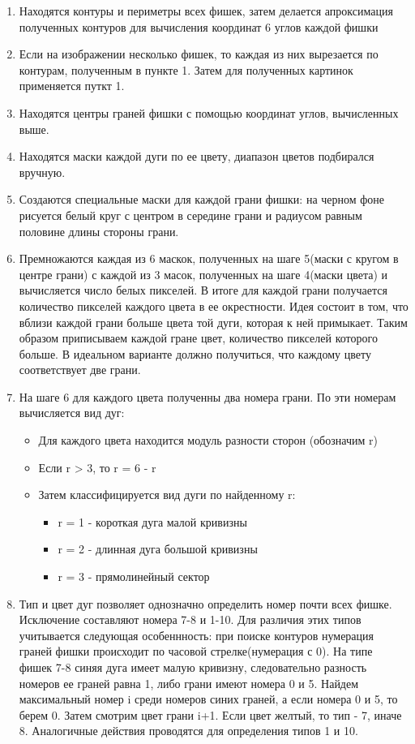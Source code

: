 \documentclass[a4paper, 12pt]{article}
\begin{document}
\begin{enumerate}
        \item Находятся контуры и периметры всех фишек, затем делается апроксимация полученных контуров для вычисления координат 6 углов каждой фишки
        \item Если на изображении несколько фишек, то каждая из них вырезается  по контурам, полученным в пункте 1. Затем для полученных картинок применяется путкт 1. 
        \item Находятся центры граней фишки с помощью координат углов, вычисленных выше.
        \item Находятся маски каждой дуги по ее цвету, диапазон цветов подбирался вручную.
        \item Создаются специальные маски для каждой грани фишки: на черном фоне рисуется белый круг с центром в середине грани и радиусом равным половине длины стороны грани. 
        \item Премножаются каждая из 6 маскок, полученных на шаге 5(маски с кругом в центре грани) с каждой из 3 масок, полученных на шаге 4(маски цвета) и вычисляется число белых пикселей. В итоге для каждой грани получается количество пикселей каждого цвета в ее окрестности. Идея состоит в том, что вблизи каждой грани больше цвета той дуги, которая к ней примыкает. Таким образом приписываем каждой гране цвет, количество пикселей которого больше. 
        В идеальном варианте должно получиться, что каждому цвету соответствует две грани. 
        \item На шаге 6 для каждого цвета полученны два номера грани. По эти номерам вычисляется вид дуг:
        \begin{itemize}
            \item Для каждого цвета находится модуль разности сторон (обозначим r)
            \item Если r > 3, то r = 6 - r
            \item Затем классифицируется вид дуги по найденному r:
                \begin{itemize} 
                    \item r = 1 - короткая дуга малой кривизны
                    \item r = 2 - длинная дуга большой кривизны
                    \item r = 3 - прямолинейный сектор
                \end{itemize}
        \end{itemize}
        \item Тип и цвет дуг позволяет однозначно определить номер почти всех фишке. Исключение составляют номера 7-8 и 1-10. Для различия этих типов учитывается следующая особеннность: при поиске контуров нумерация граней фишки происходит по часовой стрелке(нумерация с 0). На типе фишек 7-8 синяя дуга имеет малую кривизну, следовательно разность номеров ее граней равна 1, либо грани имеют номера 0 и 5. Найдем максимальный номер i среди номеров синих граней, а если номера 0 и 5, то берем 0. Затем смотрим цвет грани i+1. Если цвет  желтый, то тип - 7, иначе 8. Аналогичные действия проводятся для  определения типов 1 и 10.        
\end{enumerate}
\end{document}
